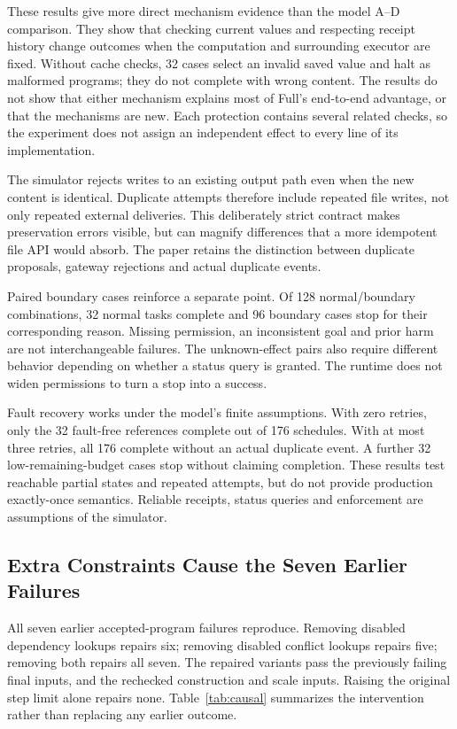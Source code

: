 \documentclass[conference]{IEEEtran}
\begin{document}
These results give more direct mechanism evidence than the model A--D comparison. They show that checking current values and respecting receipt history change outcomes when the computation and surrounding executor are fixed. Without cache checks, 32 cases select an invalid saved value and halt as malformed programs; they do not complete with wrong content. The results do not show that either mechanism explains most of Full's end-to-end advantage, or that the mechanisms are new. Each protection contains several related checks, so the experiment does not assign an independent effect to every line of its implementation.

The simulator rejects writes to an existing output path even when the new content is identical. Duplicate attempts therefore include repeated file writes, not only repeated external deliveries. This deliberately strict contract makes preservation errors visible, but can magnify differences that a more idempotent file API would absorb. The paper retains the distinction between duplicate proposals, gateway rejections and actual duplicate events.

Paired boundary cases reinforce a separate point. Of 128 normal/boundary combinations, 32 normal tasks complete and 96 boundary cases stop for their corresponding reason. Missing permission, an inconsistent goal and prior harm are not interchangeable failures. The unknown-effect pairs also require different behavior depending on whether a status query is granted. The runtime does not widen permissions to turn a stop into a success.

Fault recovery works under the model's finite assumptions. With zero retries, only the 32 fault-free references complete out of 176 schedules. With at most three retries, all 176 complete without an actual duplicate event. A further 32 low-remaining-budget cases stop without claiming completion. These results test reachable partial states and repeated attempts, but do not provide production exactly-once semantics. Reliable receipts, status queries and enforcement are assumptions of the simulator.

\subsection{Extra Constraints Cause the Seven Earlier Failures}
All seven earlier accepted-program failures reproduce. Removing disabled dependency lookups repairs six; removing disabled conflict lookups repairs five; removing both repairs all seven. The repaired variants pass the previously failing final inputs, and the rechecked construction and scale inputs. Raising the original step limit alone repairs none. Table~\ref{tab:causal} summarizes the intervention rather than replacing any earlier outcome.
\end{document}
